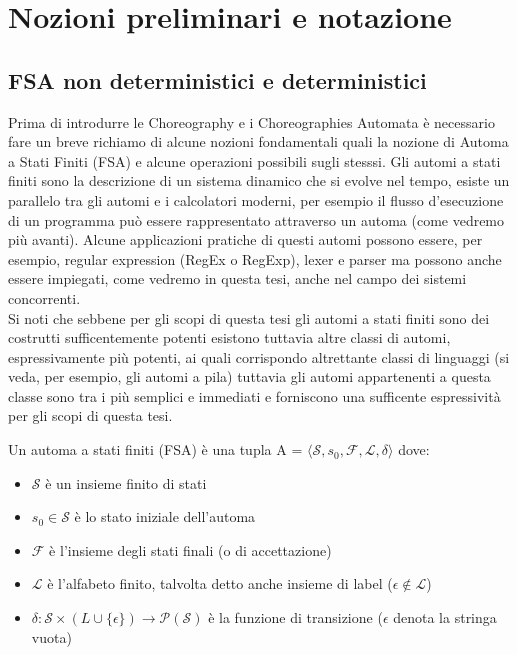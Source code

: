 \chapter{Nozioni preliminari e notazione}
\section{FSA non deterministici e deterministici}
Prima di introdurre le Choreography e i Choreographies Automata è necessario fare un breve richiamo di alcune nozioni fondamentali quali la nozione di Automa a Stati Finiti (FSA) e alcune operazioni possibili sugli stesssi.
Gli automi a stati finiti sono la descrizione di un sistema dinamico che si evolve nel tempo, esiste un parallelo tra gli automi e i calcolatori moderni, per esempio il flusso d'esecuzione di un programma può essere rappresentato attraverso un automa (come vedremo più avanti).
Alcune applicazioni pratiche di questi automi possono essere, per esempio, regular expression (RegEx o RegExp), lexer e parser ma possono anche essere impiegati, come vedremo in questa tesi, anche nel campo dei sistemi concorrenti.\\
Si noti che sebbene per gli scopi di questa tesi gli automi a stati finiti sono dei costrutti sufficentemente potenti esistono tuttavia altre classi di automi, espressivamente più potenti, ai quali corrispondo altrettante classi di linguaggi (si veda, per esempio, gli automi a pila) tuttavia gli automi appartenenti a questa classe sono tra i più semplici e immediati e forniscono una sufficente espressività per gli scopi di questa tesi.

\begin{definition}
    Un automa a stati finiti (FSA) è una tupla A = $\langle \mathcal{S}, s_0, \mathcal{F}, \mathcal{L}, \delta \rangle$ dove:
    \begin{itemize}
        \item $\mathcal{S}$ è un insieme finito di stati
        \item $s_0 \in \mathcal{S}$ è lo stato iniziale dell'automa
        \item $\mathcal{F}$ è l'insieme degli stati finali (o di accettazione)
        \item $\mathcal{L}$ è l'alfabeto finito, talvolta detto anche insieme di label ($\epsilon \notin \mathcal{L}$)
        \item $\delta : \mathcal{S} \times (L \cup \{\epsilon\}) \rightarrow \mathcal{P}(\mathcal{S})$ è la funzione di transizione ($\epsilon$ denota la stringa vuota)
    \end{itemize}
\end{definition}

